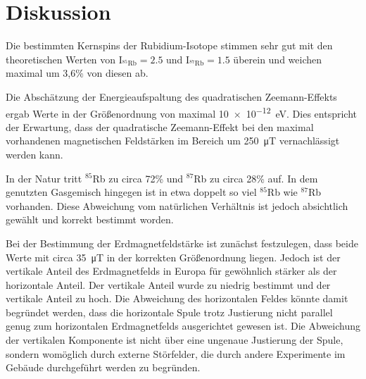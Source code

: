 \newpage
\section{Diskussion}
    Die bestimmten Kernspins der Rubidium-Isotope stimmen sehr gut mit den theoretischen Werten von $\text{I}_{\text{${}^{85}$Rb}} = \num{2.5}$ und $\text{I}_{\text{${}^{87}$Rb}} = \num{1.5}$ überein und weichen maximal um 3,6\% von diesen ab. \newline
    
    Die Abschätzung der Energieaufspaltung des quadratischen Zeemann-Effekts ergab Werte in der Größenordnung von maximal \SI{10e-12}{\electronvolt}. Dies entspricht 
    der Erwartung, dass der quadratische Zeemann-Effekt bei den maximal vorhandenen magnetischen Feldstärken im Bereich um \SI{250}{\micro\tesla} vernachlässigt werden kann. \newline
    
    In der Natur tritt ${}^{85}$Rb zu circa 72\% und ${}^{87}$Rb zu circa 28\% auf. In dem genutzten Gasgemisch hingegen ist in etwa doppelt so viel ${}^{85}$Rb wie ${}^{87}$Rb vorhanden. Diese Abweichung vom
    natürlichen Verhältnis ist jedoch absichtlich gewählt und korrekt bestimmt worden.\newline

    Bei der Bestimmung der Erdmagnetfeldstärke ist zunächst festzulegen, dass beide Werte mit circa \SI{35}{\micro\tesla} in der korrekten Größenordnung liegen. Jedoch ist der vertikale Anteil des Erdmagnetfelds in Europa für gewöhnlich stärker als der horizontale Anteil. Der vertikale Anteil wurde zu niedrig bestimmt und der vertikale Anteil zu hoch. Die Abweichung des horizontalen Feldes könnte damit begründet werden, dass die horizontale Spule trotz Justierung nicht parallel genug zum horizontalen Erdmagnetfelds ausgerichtet gewesen ist. Die Abweichung der vertikalen Komponente ist nicht über
    eine ungenaue Justierung der Spule, sondern womöglich durch externe Störfelder, die durch andere Experimente im Gebäude durchgeführt werden zu begründen.    
